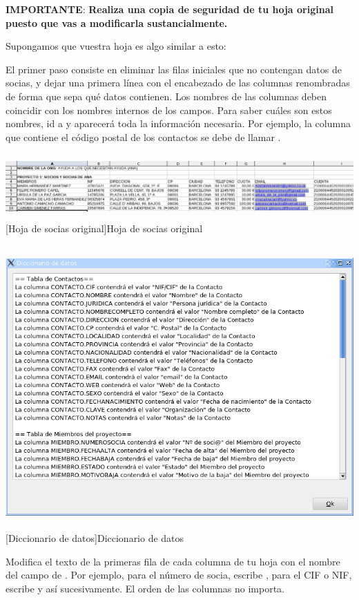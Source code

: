 \textbf{IMPORTANTE}: \textbf{Realiza una copia de seguridad de tu hoja
original puesto que vas a modificarla sustancialmente.}

Supongamos que vuestra hoja es algo similar a esto:

El primer paso consiste en eliminar las filas iniciales que no contengan
datos de socias, y dejar una primera línea con el encabezado de las
columnas renombradas de forma que \appname sepa qué datos contienen.
Los nombres de las columnas deben coincidir con los nombres internos de
los campos. Para saber cuáles son estos nombres, id a
 y aparecerá toda la información necesaria.
Por ejemplo, la columna que contiene el código postal de los
contactos se debe de llamar .

\begin{center}
\includegraphics[width=16.999cm,height=2.501cm]{manual-img15.png}
[Hoja de socias original]{Hoja de socias original}

\end{center}


\begin{center}
\includegraphics[width=14.328cm,height=10.829cm]{manual-img16.png}
[Diccionario de datos]{Diccionario de datos}

\end{center}
Modifica el texto de la primeras fila de cada columna de tu hoja con el
nombre del campo de \appname. Por ejemplo, para el número de socia,
escribe , para el CIF o NIF,
escribe  y así sucesivamente. El
orden de las columnas no importa. 

